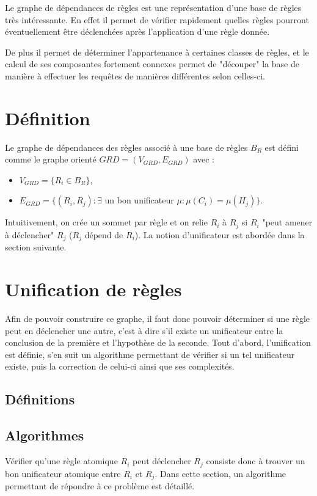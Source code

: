 
Le graphe de dépendances de règles est une représentation d'une base de règles très
intéressante. En effet il permet de vérifier rapidement quelles règles pourront
éventuellement être déclenchées après l'application d'une règle donnée.

De plus il permet de déterminer l'appartenance à certaines classes de règles, et le
calcul de ses composantes fortement connexes permet de "découper" la base de manière à 
effectuer les requêtes de manières différentes selon celles-ci. 


\section{Définition}\label{grd_def}
Le graphe de dépendances des règles associé à une base de règles $B_R$ est défini comme le 
graphe orienté $GRD = (V_{GRD},E_{GRD})$ avec :
\begin{itemize}
	\item $V_{GRD} = \{R_i \in B_R\}$,
	\item $E_{GRD} = \{(R_i,R_j) : \exists$ un bon unificateur $\mu : \mu(C_i) =
	\mu(H_j)\}$. 
\end{itemize}
Intuitivement, on crée un sommet par règle et on relie $R_i$ à $R_j$ si $R_i$ "peut
amener à déclencher" $R_j$ ($R_j$ dépend de $R_i$).
La notion d'unificateur est abordée dans la section suivante.


\section{Unification de règles}\label{grd_unif}

Afin de pouvoir construire ce graphe, il faut donc pouvoir déterminer si une règle peut
en déclencher une autre, c'est à dire s'il existe un unificateur entre la conclusion de
la première et l'hypothèse de la seconde.
Tout d'abord, l'unification est définie, s'en suit un algorithme permettant de vérifier
si un tel unificateur existe, puis la correction de celui-ci ainsi que ses complexités. 

\subsection{Définitions}\label{grd_unif_def}


\subsection{Algorithmes}\label{grd_algo}
	Vérifier qu'une règle atomique $R_i$ peut déclencher $R_j$ consiste donc à trouver un bon
	unificateur atomique entre $R_i$ et $R_j$. Dans cette section, un algorithme
	permettant de répondre à ce problème est détaillé.

